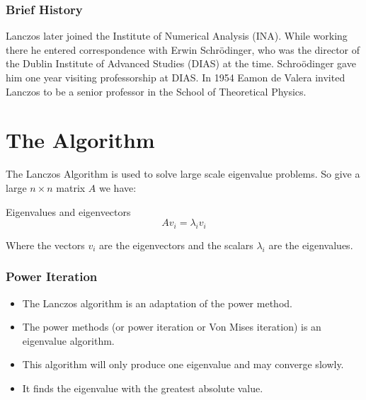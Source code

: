 \documentclass[pdf]{beamer}
\begin{document}
\begin{frame}
\centering
\frametitle{Brief History}

Lanczos later joined the Institute of Numerical Analysis (INA). While working there he entered correspondence with Erwin Schr\"{o}dinger, who was the director of the Dublin Institute of Advanced Studies (DIAS) at the time. Schro\"{o}dinger gave him one year visiting professorship at DIAS. In 1954 Eamon de Valera invited Lanczos to be a senior professor in the School of Theoretical Physics.

\end{frame}




\section{The Algorithm}
\begin{frame}
\tableofcontents[currentsection]
\end{frame}



\begin{frame}
The Lanczos Algorithm is used to solve large scale eigenvalue problems. So give a large $n \times n$ matrix $A$ we have:
\begin{exampleblock}{Eigenvalues and eigenvectors}
\[
A v_i = \lambda_i v_i
\]
\end{exampleblock}
Where the vectors $v_i$ are the eigenvectors and the scalars $\lambda_i$ are the eigenvalues.
\end{frame}


\begin{frame}
\frametitle{Power Iteration}
\begin{itemize}

\item The Lanczos algorithm is an adaptation of the power method.
\item The power methods (or power iteration or Von Mises iteration) is an eigenvalue algorithm.
\item This algorithm will only produce one eigenvalue and may converge slowly.
\item It finds the eigenvalue with the greatest absolute value.

\end{itemize}
\end{frame}
\end{document}
